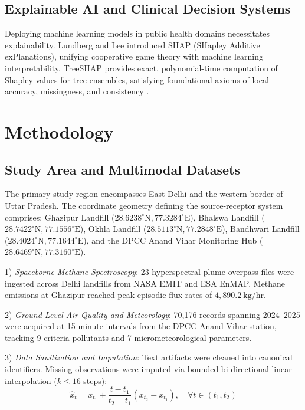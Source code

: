 \documentclass[conference]{IEEEtran}
\begin{document}
\subsection{Explainable AI and Clinical Decision Systems}
Deploying machine learning models in public health domains necessitates explainability. Lundberg and Lee \cite{lundberg2017unified} introduced SHAP (SHapley Additive exPlanations), unifying cooperative game theory with machine learning interpretability. TreeSHAP provides exact, polynomial-time computation of Shapley values for tree ensembles, satisfying foundational axioms of local accuracy, missingness, and consistency \cite{lundberg2020local, masood2022explainable}.

\section{Methodology}
\subsection{Study Area and Multimodal Datasets}
The primary study region encompasses East Delhi and the western border of Uttar Pradesh. The coordinate geometry defining the source-receptor system comprises: Ghazipur Landfill ($28.6238^\circ\text{N}, 77.3284^\circ\text{E}$), Bhalswa Landfill ($28.7422^\circ\text{N}, 77.1556^\circ\text{E}$), Okhla Landfill ($28.5113^\circ\text{N}, 77.2848^\circ\text{E}$), Bandhwari Landfill ($28.4024^\circ\text{N}, 77.1644^\circ\text{E}$), and the DPCC Anand Vihar Monitoring Hub ($28.6469^\circ\text{N}, 77.3160^\circ\text{E}$).

1) \textit{Spaceborne Methane Spectroscopy}: 23 hyperspectral plume overpass files were ingested across Delhi landfills from NASA EMIT and ESA EnMAP. Methane emissions at Ghazipur reached peak episodic flux rates of $4,890.2\ \text{kg/hr}$.

2) \textit{Ground-Level Air Quality and Meteorology}: 70,176 records spanning 2024--2025 were acquired at 15-minute intervals from the DPCC Anand Vihar station, tracking 9 criteria pollutants and 7 micrometeorological parameters.

3) \textit{Data Sanitization and Imputation}: Text artifacts were cleaned into canonical identifiers. Missing observations were imputed via bounded bi-directional linear interpolation ($k \le 16$ steps):
\begin{equation}
\hat{x}_t = x_{t_1} + \frac{t - t_1}{t_2 - t_1}(x_{t_2} - x_{t_1}), \quad \forall t \in (t_1, t_2)
\end{equation}
\end{document}
